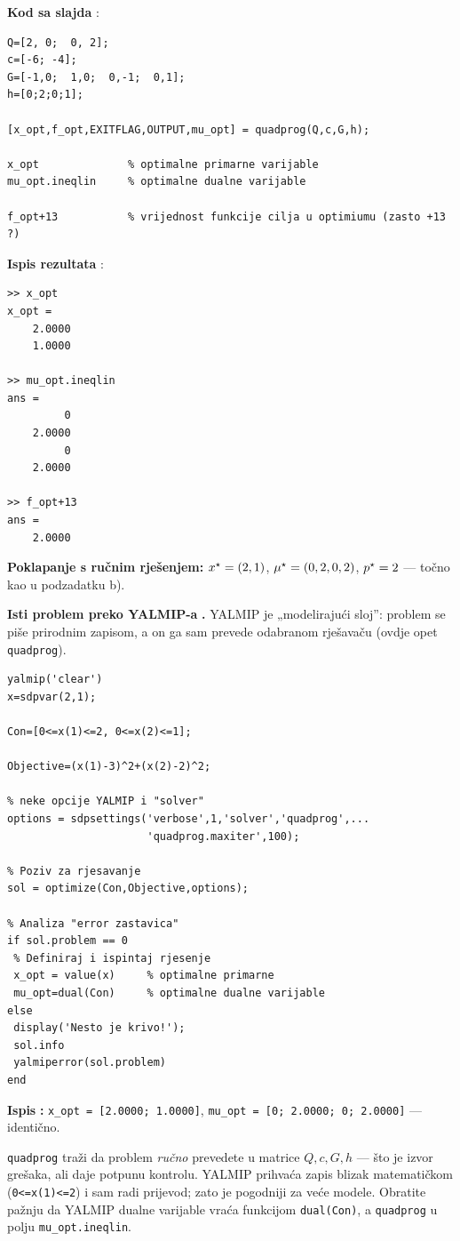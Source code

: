 \textbf{Kod sa slajda} :

\begin{verbatim}
Q=[2, 0;  0, 2];
c=[-6; -4];
G=[-1,0;  1,0;  0,-1;  0,1];
h=[0;2;0;1];

[x_opt,f_opt,EXITFLAG,OUTPUT,mu_opt] = quadprog(Q,c,G,h);

x_opt              % optimalne primarne varijable
mu_opt.ineqlin     % optimalne dualne varijable

f_opt+13           % vrijednost funkcije cilja u optimiumu (zasto +13 ?)
\end{verbatim}

\textbf{Ispis rezultata} :

\begin{verbatim}
>> x_opt
x_opt =
    2.0000
    1.0000

>> mu_opt.ineqlin
ans =
         0
    2.0000
         0
    2.0000

>> f_opt+13
ans =
    2.0000
\end{verbatim}

\textbf{Poklapanje s ručnim rješenjem:} $x^{\star} = (2,1)$,
$\mu^{\star} = (0,2,0,2)$, $p^{\star} = 2$ --- točno kao u podzadatku b). \checkmark

\textbf{Isti problem preko YALMIP-a} \textbf{.} YALMIP je
„modelirajući sloj”: problem se piše prirodnim zapisom, a on ga sam prevede
odabranom rješavaču (ovdje opet \texttt{quadprog}).

\begin{verbatim}
yalmip('clear')
x=sdpvar(2,1);

Con=[0<=x(1)<=2, 0<=x(2)<=1];

Objective=(x(1)-3)^2+(x(2)-2)^2;

% neke opcije YALMIP i "solver"
options = sdpsettings('verbose',1,'solver','quadprog',...
                      'quadprog.maxiter',100);

% Poziv za rjesavanje
sol = optimize(Con,Objective,options);

% Analiza "error zastavica"
if sol.problem == 0
 % Definiraj i ispintaj rjesenje
 x_opt = value(x)     % optimalne primarne
 mu_opt=dual(Con)     % optimalne dualne varijable
else
 display('Nesto je krivo!');
 sol.info
 yalmiperror(sol.problem)
end
\end{verbatim}

\textbf{Ispis} \textbf{:} \texttt{x\_opt = [2.0000; 1.0000]},
\texttt{mu\_opt = [0; 2.0000; 0; 2.0000]} --- identično. \checkmark

\begin{napomena}
\texttt{quadprog} traži da problem \emph{ručno} prevedete u matrice
$Q, c, G, h$ --- što je izvor grešaka, ali daje potpunu kontrolu. YALMIP
prihvaća zapis blizak matematičkom (\texttt{0<=x(1)<=2}) i sam radi prijevod;
zato je pogodniji za veće modele. Obratite pažnju da YALMIP dualne varijable
vraća funkcijom \texttt{dual(Con)}, a \texttt{quadprog} u polju
\texttt{mu\_opt.ineqlin}.
\end{napomena}

